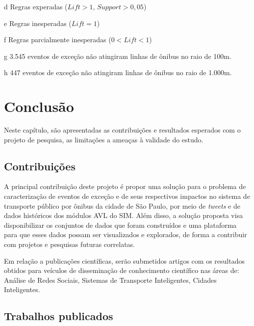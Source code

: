 \documentclass[
	12pt,				%
	oneside,			%
	a4paper,			%
	english,			%
	brazil				%
	]{abntex2ppgsi}
\begin{document}
\begin{table}[!htb]
\begin{threeparttable}
\begin{tablenotes}
            \item[d] Regras experadas ($Lift > 1$, $Support > 0,05$)
            \item[e] Regras inesperadas ($Lift = 1$)
            \item[f] Regras parcialmente inesperadas ($0 < Lift < 1$)
            \item[g] 3.545 eventos de exceção não atingiram linhas de ônibus no raio de 100m.
            \item[h] 447 eventos de exceção não atingiram linhas de ônibus no raio de 1.000m.
        \end{tablenotes}
\end{threeparttable}
\end{table}

\chapter{Conclusão}
\label{conclusion}

Neste capítulo, são apresentadas as contribuições e resultados esperados com o projeto de pesquisa, as limitações a ameaças à validade do estudo. 

\section{Contribuições}

A principal contribuição deste projeto é propor uma solução para o problema de caracterização de eventos de exceção e de seus respectivos impactos no sistema de transporte público por ônibus da cidade de São Paulo, por meio de \textit{tweets} e de dados históricos dos módulos AVL do SIM. Além disso, a solução proposta visa disponibilizar os conjuntos de dados que foram construídos e uma plataforma para que esses dados possam ser visualizados e explorados, de forma a contribuir com projetos e pesquisas futuras correlatas.

Em relação a publicações científicas, serão submetidos artigos com os resultados obtidos para veículos de disseminação de conhecimento científico nas áreas de: Análise de Redes Sociais, Sistemas de Transporte Inteligentes, Cidades Inteligentes.

\section{Trabalhos publicados}
\end{document}
